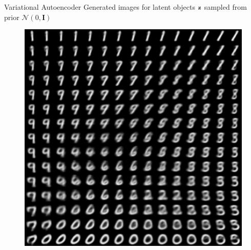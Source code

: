 \begin{frame}{Variational Autoencoder}
	Generated images for latent objects $\mathbf{z}$ sampled from prior $\mathcal{N}(0, \mathbf{I})$
	\begin{figure}[h]
		\centering
		\includegraphics[width=.5\linewidth]{figs/vae_0.png}
	\end{figure}
\end{frame}
